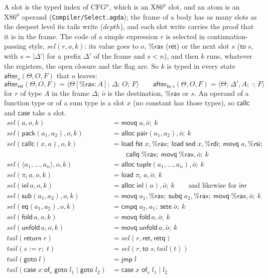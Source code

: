 \documentclass[10pt]{article}
\theoremstyle{acmplain}
\newcommand{\key}[1]{\mathsf{#1}}
\newcommand{\pass}[1]{\mathit{#1}}
\newcommand{\inl}{\key{inl}\,}
\newcommand{\tuple}[1]{\langle #1 \rangle}
\newcommand{\prj}[1]{\pi_{#1}\,}
\newcommand{\assign}[3]{#1 \mathrel{:=} #2;\; #3}
\newcommand{\rax}{\%\key{rax}}
\newcommand{\rdi}{\%\key{rdi}}
\newcommand{\rsi}{\%\key{rsi}}
\newcommand{\Tpack}[2]{\key{pack}(#1, #2)}     %
\newcommand{\Tcallc}[2]{\key{callc}(#1, #2)}   %
\newcommand{\Treturn}[1]{\key{return}\;#1}
\newcommand{\Tgoto}[1]{\key{goto}\;#1}
\newcommand{\Tcase}[4]{\key{case}\;#1\;\key{of}_{#2}\;\key{goto}\;#3 \mid \key{goto}\;#4}
\newcommand{\Tst}[4]{\langle #1;\, #2;\, #3;\, #4 \rangle} %
\newcommand{\Ml}[1]{\textrm{#1}^{\mu}}                  %
\newcommand{\Mfold}{\key{fold}\,}
\newcommand{\Munfold}{\key{unfold}\,}
\newcommand{\Mxcase}[4]{\key{case}\;#1\;\key{of}_{#2}\;#3 \mid #4}  %
\begin{document}
A slot is the typed index of $\Ml{CFG}$, which is an $\Ml{X86}$ slot, and an
atom is an $\Ml{X86}$ operand (\texttt{Compiler/Select.agda}); the frame of
a body has as many slots as the deepest level its tails write
($\mathit{depth}$), and each slot write carries the proof that it is in the
frame. The code of a simple expression $r$ is selected in
continuation-passing style, $\pass{sel}(r, o, k)$: its value goes to $o$,
$\rax$ ($\key{ret}$) or the next slot $s$ ($\key{to}\;s$, with
$s = |\Delta'|$ for a prefix $\Delta'$ of the frame and $s < n$), and then
$k$ runs, whatever the registers, the open closure and the flag are. So
$k$ is typed in every state $\key{after}_o(\Theta, O, F)$ that $o$ leaves:
\[
  \key{after}_{\key{ret}}(\Theta, O, F) = \Tst{\Theta[\rax{:}A]}{\Delta}{O}{F}
  \qquad
  \key{after}_{\key{to}\;s}(\Theta, O, F) = \Tst{\Theta}{\Delta', A}{\cdot}{F}
\]
for $r$ of type $A$ in the frame $\Delta$; $\bar{o}$ is the destination,
$\rax$ or $s$. An operand of a function type or of a sum type is a slot
$x$ (no constant has those types), so $\key{callc}$ and $\key{case}$ take a
slot.
\begin{align*}
  \pass{sel}(a, o, k) &= \key{movq}\; a, \bar{o};\ k \\
  \pass{sel}(\Tpack{a_1}{a_2}, o, k) &= \key{alloc}\; \key{pair}(a_1, a_2), \bar{o};\ k \\
  \pass{sel}(\Tcallc{x}{a}, o, k) &= \key{load}\; \key{fst}\; x, \rax;\
    \key{load}\; \key{snd}\; x, \rdi;\ \key{movq}\; a, \rsi; \\
  &\qquad \key{callq}\; \rax;\ \key{movq}\; \rax, \bar{o};\ k \\
  \pass{sel}(\tuple{a_1, \ldots, a_n}, o, k) &= \key{alloc}\; \key{tuple}(a_1, \ldots, a_n), \bar{o};\ k \\
  \pass{sel}(\prj{i} a, o, k) &= \key{load}\; \pi_i\; a, \bar{o};\ k \\
  \pass{sel}(\inl a, o, k) &= \key{alloc}\; \key{inl}(a), \bar{o};\ k
    \qquad\text{and likewise for } \key{inr} \\
  \pass{sel}(\key{sub}(a_1, a_2), o, k) &= \key{movq}\; a_1, \rax;\
    \key{subq}\; a_2, \rax;\ \key{movq}\; \rax, \bar{o};\ k \\
  \pass{sel}(\key{eq}(a_1, a_2), o, k) &= \key{cmpq}\; a_2, a_1;\ \key{sete}\; \bar{o};\ k \\
  \pass{sel}(\Mfold a, o, k) &= \key{movq}\; \Mfold a, \bar{o};\ k \\
  \pass{sel}(\Munfold a, o, k) &= \key{movq}\; \Munfold a, \bar{o};\ k \\[1ex]
  \pass{tail}(\Treturn{r}) &= \pass{sel}(r, \key{ret}, \key{retq}) \\
  \pass{tail}(\assign{s}{r}{t}) &= \pass{sel}(r, \key{to}\;s, \pass{tail}(t)) \\
  \pass{tail}(\Tgoto{l}) &= \key{jmp}\; l \\
  \pass{tail}(\Tcase{x}{s}{l_1}{l_2}) &= \Mxcase{x}{s}{l_1}{l_2}
\end{align*}
\end{document}
